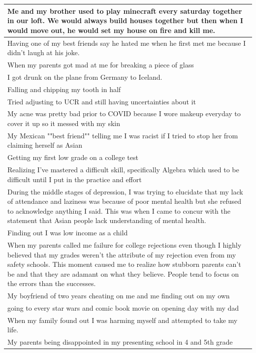 \documentclass[
  .7em,
  letterpaper,
  DIV=11,
  numbers=noendperiod]{scrartcl}
\begin{document}
\begin{table}
\begin{tabular}{l}
\hline
Me and my brother used to play minecraft every saturday together in our loft. We would always build houses together but then when I would move out, he would set my house on fire and kill me.\\
\hline
Having one of my best friends say he hated me when he first met me because I didn't laugh at his joke.\\
\hline
When my parents got mad at me for breaking a piece of glass\\
\hline
I got drunk on the plane from Germany to Iceland.\\
\hline
Falling and chipping my tooth in half\\
\hline
Tried adjusting to UCR and still having uncertainties about it\\
\hline
My acne was pretty bad prior to COVID because I wore makeup everyday to cover it up so it messed with my skin\\
\hline
My Mexican ""best friend"" telling me I was racist if I tried to stop her from claiming herself as Asian\\
\hline
Getting my first low grade on a college test\\
\hline
Realizing I've mastered a difficult skill, specifically Algebra which used to be difficult until I put in the practice and effort\\
\hline
During the middle stages of depression, I was trying to elucidate that my lack of attendance and laziness was because of poor mental health but she refused to acknowledge anything I said. This was when I came to concur with the statement that Asian people lack understanding of mental health.\\
\hline
Finding out I was low income as a child\\
\hline
When my parents called me failure for college rejections even though I highly believed that my grades weren't the attribute of my rejection even from my safety schools. This moment caused me to realize how stubborn parents can't be and that they are adamant on what they believe. People tend to focus on the errors than the successes.\\
\hline
My boyfriend of two years cheating on me and me finding out on my own\\
\hline
going to every star wars and comic book movie on opening day with my dad\\
\hline
When my family found out I was harming myself and attempted to take my life.\\
\hline
My parents being disappointed in my presenting school in 4 and 5th grade\\

\end{tabular}
\end{table}
\end{document}
